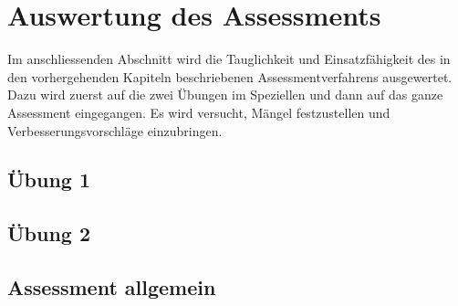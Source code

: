 \chapter{Auswertung des Assessments}

Im anschliessenden Abschnitt wird die Tauglichkeit und Einsatzfähigkeit des in den vorhergehenden Kapiteln beschriebenen Assessmentverfahrens ausgewertet. Dazu wird zuerst auf die zwei Übungen im Speziellen und dann auf das ganze Assessment eingegangen. Es wird versucht, Mängel festzustellen und Verbesserungsvorschläge einzubringen.

\section{Übung 1}
\section{Übung 2}
\section{Assessment allgemein}